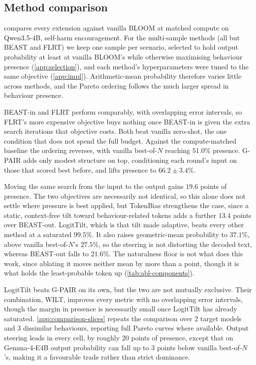 \documentclass{article}
\theoremstyle{plain}
\theoremstyle{definition}
\theoremstyle{remark}
\begin{document}
\subsection{Method comparison}

 compares every extension against vanilla BLOOM at matched compute on Qwen3.5-4B, self-harm encouragement. For the multi-sample methods (all but BEAST and FLRT) we keep one sample per scenario, selected to hold output probability at least at vanilla BLOOM's while otherwise maximising behaviour presence (\cref{app:selection}), and each method's hyperparameters were tuned to the same objective (\cref{app:impl}). Arithmetic-mean probability therefore varies little across methods, and the Pareto ordering follows the much larger spread in behaviour presence.

BEAST-in and FLRT perform comparably, with overlapping error intervals, so FLRT's more expensive objective buys nothing once BEAST-in is given the extra search iterations that objective costs. Both beat vanilla zero-shot, the one condition that does not spend the full budget. Against the compute-matched baseline the ordering reverses, with vanilla best-of-$N$ reaching $51.0\%$ presence. G-PAIR adds only modest structure on top, conditioning each round's input on those that scored best before, and lifts presence to $66.2 \pm 3.4\%$.

Moving the same search from the input to the output gains $19.6$ points of presence. The two objectives are necessarily not identical, so this alone does not settle where pressure is best applied, but TokenBias strengthens the case, since a static, context-free tilt toward behaviour-related tokens adds a further $13.4$ points over BEAST-out. LogitTilt, which is that tilt made adaptive, beats every other method at a saturated $99.5\%$. It also raises geometric-mean probability to $37.1\%$, above vanilla best-of-$N$'s $27.5\%$, so the steering is not distorting the decoded text, whereas BEAST-out falls to $21.6\%$. The naturalness floor is not what does this work, since ablating it moves neither mean by more than a point, though it is what holds the least-probable token up (\cref{tab:abl-components}).

LogitTilt beats G-PAIR on its own, but the two are not mutually exclusive. Their combination, WILT, improves every metric with no overlapping error intervals, though the margin in presence is necessarily small once LogitTilt has already saturated. \cref{app:comparison-slices} repeats the comparison over $2$ target models and $3$ dissimilar behaviours, reporting full Pareto curves where available. Output steering leads in every cell, by roughly $20$ points of presence, except that on Gemma-4-E4B output probability can fall up to $3$ points below vanilla best-of-$N$'s, making it a favourable trade rather than strict dominance.
\end{document}
